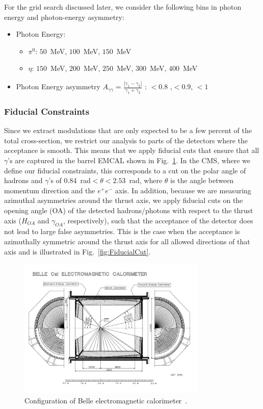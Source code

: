 For the grid search discussed later, we consider the following bins in photon energy and photon-energy asymmetry:
\begin{itemize}
  \item Photon Energy:
    \begin{itemize}
      \item $\pi^{0}$: $50$~MeV, $100$~MeV, $150$~MeV 
      \item $\eta$: $150$~MeV, $200$~MeV, $250$~MeV, $300$~MeV, $400$~MeV
    \end{itemize}
  \item Photon Energy asymmetry $A_{\gamma\gamma}=\frac{|\gamma_1-\gamma_2|}{\gamma_1+\gamma_2}$ : $<0.8$ ,$<0.9$, $<1$
\end{itemize}



\subsubsection{Fiducial Constraints}
\label{sec:fiducialcut}
Since we extract modulations that are only expected to be a few percent of the total cross-section, we restrict our analysis to parts of the detectors where the acceptance is smooth. This means that we apply fiducial cuts that ensure that all $\gamma$'s are captured in the barrel EMCAL shown in Fig.~\ref{fig:2}. In the CMS, where we define our fiducial constraints, this corresponds to a cut on the polar angle of  hadrons and $\gamma$'s of 0.84~rad\(<\theta<2.53\)~rad, where $\theta$ is the angle between momentum direction and the $e^+e^-$ axis.
  In addition, because we are measuring azimuthal asymmetries around the thrust axis, we apply fiducial cuts on the opening angle (OA) of the detected hadrons/photons with respect to the thrust axis ($H_{OA}$ and $\gamma_{OA}$, respectively), such that the acceptance of the detector does not lead to large false asymmetries. This is the case when the acceptance is azimuthally symmetric around the thrust axis for all allowed directions of that axis and is illustrated in Fig.~\ref{fig:FiducialCut}. 

\begin{figure}[H]
  \centering
  \includegraphics[width=0.8\textwidth,natwidth=610,natheight=642]{figure_dataselection/EMCAL.pdf}
  \caption{Configuration of Belle electromagnetic calorimeter~\cite{BelleDetector}.}
  \label{fig:2}
\end{figure}

